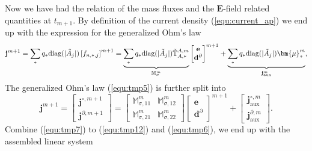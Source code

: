 \documentclass{article}
\begin{document}
Now we have had the relation of the mass fluxes and the $\mathbf{E}$-field related quantities at $t_{m+1}$. By definition of the current density (\ref{equ:current_ap}) we end up with the expression for the generalized Ohm's law 
\begin{equation} \label{equ:tmp5}
    \mathbf{j}^{m+1} = \sum_*q_*\text{diag}(|\Tilde{A}_j|)\left[f_{n,*,j}\right]^{m+1} = \underbrace{\sum_*q_*\text{diag}(|\Tilde{A}_j|) \Tilde{\mathbb{T}}_{A,*}^{A,m}}_{\mathbb{M}_\sigma^m} \begin{bmatrix}
    \mathbf{e} \\
    \mathbf{d}^\partial 
    \end{bmatrix}^{m+1} + \underbrace{\sum_*q_*\text{diag}(|\Tilde{A}_j|) \bm{\mu}^m_*}_{\mathbf{j}^m_\text{aux}},
\end{equation}
The generalized Ohm's law (\ref{equ:tmp5}) is further split into
\begin{equation} \label{equ:tmp6}
    \mathbf{j}^{m+1} =
    \begin{bmatrix}
    \mathbf{j}^{\circ,m+1} \\
    \mathbf{j}^{\partial, m+1}
    \end{bmatrix} =
    \begin{bmatrix}
    \mathbb{M}_{\sigma,11}^m & \mathbb{M}_{\sigma,12}^m \\
    \mathbb{M}_{\sigma,21}^m & \mathbb{M}_{\sigma,22}^m
    \end{bmatrix}
    \begin{bmatrix}
    \mathbf{e} \\
    \mathbf{d}^\partial 
    \end{bmatrix}^{m+1} +
    \begin{bmatrix}
    \mathbf{j}^{\circ, m}_\text{aux} \\
    \mathbf{j}^{\partial,m}_\text{aux}
    \end{bmatrix}.
\end{equation}
Combine (\ref{equ:tmp7}) to (\ref{equ:tmp12}) and (\ref{equ:tmp6}), we end up with the assembled linear system
\end{document}
